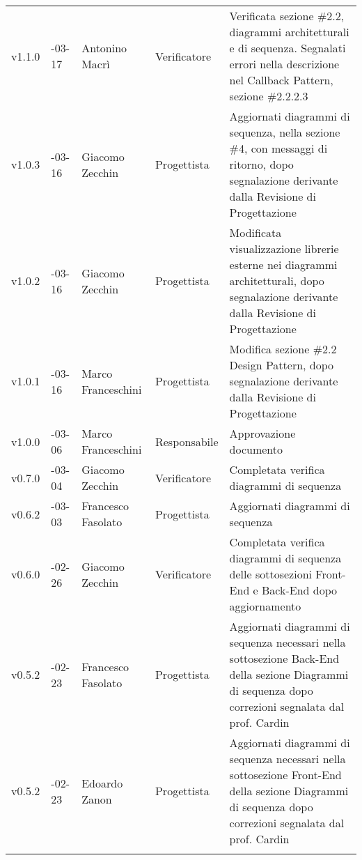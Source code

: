 \begin{longtable} { >{\centering}p{1.4cm} >{\centering}p{2cm} >{\centering}p{2.3cm} >{\centering}p{2.7cm} p{5.5cm} }
	\addlinespace[0.4em]
	\midrule
	\addlinespace[0.4em]
	v1.1.0 & 2017-03-17 &  Antonino Macrì & Verificatore & Verificata sezione \#2.2, diagrammi architetturali e di sequenza. Segnalati errori nella descrizione nel Callback Pattern, sezione \#2.2.2.3 \\
	\addlinespace[0.4em]
	\midrule
	\addlinespace[0.4em]
	v1.0.3 & 2017-03-16 &  Giacomo Zecchin & Progettista & Aggiornati diagrammi di sequenza, nella sezione \#4, con messaggi di ritorno, dopo segnalazione derivante dalla Revisione di Progettazione \\
	\addlinespace[0.4em]
	\midrule
	\addlinespace[0.4em]
	v1.0.2 & 2017-03-16 &  Giacomo Zecchin & Progettista & Modificata visualizzazione librerie esterne nei diagrammi architetturali, dopo segnalazione derivante dalla Revisione di Progettazione  \\
	\addlinespace[0.4em]
	\midrule
	\addlinespace[0.4em]
	v1.0.1 & 2017-03-16 &  Marco Franceschini & Progettista & Modifica sezione \#2.2 Design Pattern, dopo segnalazione derivante dalla Revisione di Progettazione \\
	\addlinespace[0.4em]
	\midrule
	\addlinespace[0.4em]
	v1.0.0 & 2017-03-06 &  Marco Franceschini & Responsabile & Approvazione documento \\
	\addlinespace[0.4em]
	\midrule
	\addlinespace[0.4em]
	v0.7.0 & 2017-03-04 & Giacomo Zecchin & Verificatore & Completata verifica diagrammi di sequenza \\
	\addlinespace[0.4em]
	\midrule
	\addlinespace[0.4em]
	v0.6.2 & 2017-03-03 & Francesco Fasolato & Progettista & Aggiornati diagrammi di sequenza \\
	\addlinespace[0.4em]
	\midrule
	\addlinespace[0.4em]
	v0.6.0 & 2017-02-26 & Giacomo Zecchin & Verificatore & Completata verifica diagrammi di sequenza delle sottosezioni Front-End e Back-End dopo aggiornamento \\
	\addlinespace[0.4em]
	\midrule
	\addlinespace[0.4em]
	v0.5.2 & 2017-02-23 & Francesco Fasolato & Progettista & Aggiornati diagrammi di sequenza necessari nella sottosezione Back-End della sezione Diagrammi di  sequenza dopo correzioni segnalata dal prof. Cardin  \\
	\addlinespace[0.4em]
	\midrule
	\addlinespace[0.4em]
	v0.5.2 & 2017-02-23 & Edoardo Zanon & Progettista & Aggiornati diagrammi di sequenza necessari nella sottosezione Front-End della sezione Diagrammi di  sequenza dopo correzioni segnalata dal prof. Cardin  \\
	\addlinespace[0.4em]
	\midrule
	\addlinespace[0.4em]

\end{longtable}
